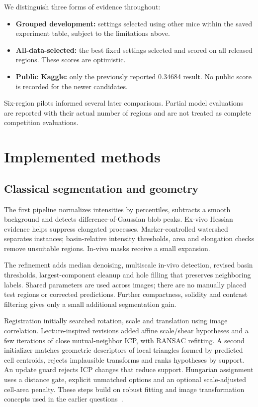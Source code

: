 \documentclass[11pt]{article}
\begin{document}
We distinguish three forms of evidence throughout:
\begin{itemize}
\item \textbf{Grouped development:} settings selected using other mice within the saved experiment table, subject to the limitations above.
\item \textbf{All-data-selected:} the best fixed settings selected and scored on all released regions. These scores are optimistic.
\item \textbf{Public Kaggle:} only the previously reported 0.34684 result. No public score is recorded for the newer candidates.
\end{itemize}
Six-region pilots informed several later comparisons. Partial model evaluations are reported with their actual number of regions and are not treated as complete competition evaluations.

\section{Implemented methods}
\subsection{Classical segmentation and geometry}
The first pipeline normalizes intensities by percentiles, subtracts a smooth background and detects difference-of-Gaussian blob peaks. Ex-vivo Hessian evidence helps suppress elongated processes. Marker-controlled watershed separates instances; basin-relative intensity thresholds, area and elongation checks remove unsuitable regions. In-vivo masks receive a small expansion.

The refinement adds median denoising, multiscale in-vivo detection, revised basin thresholds, largest-component cleanup and hole filling that preserves neighboring labels. Shared parameters are used across images; there are no manually placed test regions or corrected predictions. Further compactness, solidity and contrast filtering gives only a small additional segmentation gain.

Registration initially searched rotation, scale and translation using image correlation. Lecture-inspired revisions added affine scale/shear hypotheses and a few iterations of close mutual-neighbor ICP, with RANSAC refitting. A second initializer matches geometric descriptors of local triangles formed by predicted cell centroids, rejects implausible transforms and ranks hypotheses by support. An update guard rejects ICP changes that reduce support. Hungarian assignment uses a distance gate, explicit unmatched options and an optional scale-adjusted cell-area penalty. These steps build on robust fitting and image transformation concepts used in the earlier questions~\cite{lectures}.
\end{document}
